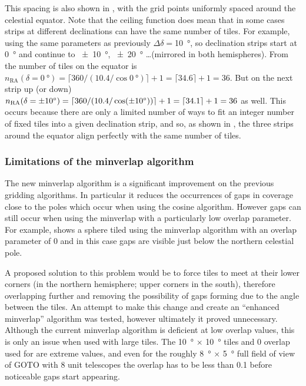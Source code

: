\begin{colsection}
\begin{colsection}
This spacing is also shown in , with the grid points uniformly spaced around the celestial equator. Note that the ceiling function does mean that in some cases strips at different declinations can have the same number of tiles. For example, using the same parameters as previously $\Delta\delta=$\SI{10}{\degree}, so declination strips start at \SI{0}{\degree} and continue to \SI{\pm10}{\degree}, \SI{\pm20}{\degree} \ldots (mirrored in both hemispheres). From  the number of tiles on the equator is $n_\text{RA}(\delta=\SI{0}{\degree}) = \lceil 360/(10.4/\cos \SI{0}{\degree}) \rceil + 1 = \lceil 34.6 \rceil + 1 = 36$. But on the next strip up (or down) $n_\text{RA}(\delta=\SI{\pm10}{\degree}) = \lceil 360/(10.4/\cos(\pm\SI{10}{\degree})) \rceil + 1 = \lceil 34.1 \rceil + 1 = 36$ as well. This occurs because there are only a limited number of ways to fit an integer number of fixed tiles into a given declination strip, and so, as shown in , the three strips around the equator align perfectly with the same number of tiles.

\subsubsection{Limitations of the minverlap algorithm}

The new minverlap algorithm is a significant improvement on the previous gridding algorithms. In particular it reduces the occurrences of gaps in coverage close to the poles which occur when using the cosine algorithm. However gaps can still occur when using the minverlap with a particularly low overlap parameter. For example,  shows a sphere tiled using the minverlap algorithm with an overlap parameter of 0 and in this case gaps are visible just below the northern celestial pole.

A proposed solution to this problem would be to force tiles to meet at their lower corners (in the northern hemisphere; upper corners in the south), therefore overlapping further and removing the possibility of gaps forming due to the angle between the tiles. An attempt to make this change and create an ``enhanced minverlap'' algorithm was tested, however ultimately it proved unnecessary. Although the current minverlap algorithm is deficient at low overlap values, this is only an issue when used with large tiles. The \SI{10}{\degree} $\times$ \SI{10}{\degree} tiles and 0 overlap used for  are extreme values, and even for the roughly \SI{8}{\degree} $\times$ \SI{5}{\degree} full field of view of GOTO with 8 unit telescopes the overlap has to be less than 0.1 before noticeable gaps start appearing.


\end{colsection}
\end{colsection}
